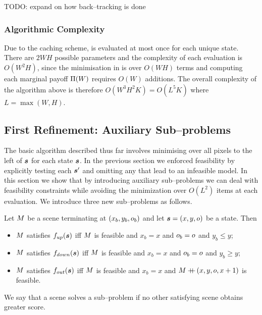 TODO: expand on how back--tracking is done

\subsubsection{Algorithmic Complexity}
Due to the caching scheme,  is evaluated
at most once for each unique state. There are $2WH$ possible
parameters and the complexity of each evaluation is $O(W^2H)$, since
the minimisation in  is over $O(WH)$
terms and computing each marginal payoff $\ScenePayoff(\Wall)$
requires $O(W)$ additions. The overall complexity of the algorithm
above is therefore $O(W^3H^2K) = O(L^5K)$ where $L=\max(W,H)$.

\subsection{First Refinement: Auxiliary Sub--problems}

The basic algorithm described thus far involves minimising over all
pixels to the left of $\State$ for each state $\State$. In the
previous section we enforced feasibility by explicitly testing each
$\State'$ and omitting any that lead to an infeasible model. In this
section we show that by introducing auxiliary sub--problems we can
deal with feasibility constraints while avoiding the minimization over
$O(L^2)$ items at each evaluation. We introduce three new
sub--problems as follows.
\begin{definition}
  \label{def:aux-sub-problems}
  Let $\Scene$ be a scene terminating at $(x_b,y_b,\WallOrient_b)$ and
  let $\State=(x,y,\WallOrient)$ be a state. Then
  \begin{itemize}
    \item{$\Scene$ satisfies $\SubProbUP(\State)$ iff $\Scene$
      is feasible and $x_b=x$ and $\WallOrient_b=\WallOrient$ and $y_b \leq y$;}
    \item{$\Scene$ satisfies $\SubProbDOWN(\State)$ iff
      $\Scene$ is feasible and $x_b=x$ and $\WallOrient_b=\WallOrient$ and $y_b \geq y$;}
    \item{$\Scene$ satisfies $\SubProbOUT(\State)$ iff
      $\Scene$ is feasible and $x_b=x$ and $\Scene\concat(x,y,\WallOrient,x+1)$ is
      feasible.}
  \end{itemize}
  We say that a scene solves a sub--problem if no other satisfying
  scene obtains greater score.
\end{definition}

